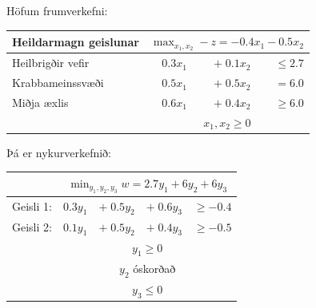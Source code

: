 \begin{daemi}Höfum frumverkefni:
\begin{center}{\renewcommand{\arraystretch}{1.5} \renewcommand{\tabcolsep}{0.2cm}
\begin{tabular}{|l|rrr|}\hline
Heildarmagn geislunar & \multicolumn{3}{c|}{$\max_{x_1,x_2} -z = -0.4x_1 - 0.5x_2$} \\ \hline
Heilbrigðir vefir & $0.3x_1$ & $+\; 0.1x_2$ & $ \le  2.7 $ \\
Krabbameinssvæði & $ 0.5x_1 $&$ +\; 0.5x_2 $&$=  6.0 $ \\
Miðja æxlis & $0.6x_1$&$ +\; 0.4x_2$& $\ge 6.0$ \\ 
& \multicolumn{3}{c|}{$x_1,x_2 \ge 0$} \\ \hline
\end{tabular}} 
\end{center}
\end{daemi}
\begin{lausn}Þá er nykurverkefnið:
\begin{center}{\renewcommand{\arraystretch}{1.5} \renewcommand{\tabcolsep}{0.2cm}
\begin{tabular}{|l|rrrr|}\hline
&\multicolumn{4}{c|}{$\min_{y_1,y_2,y_3} w = 2.7y_1 + 6y_2+6y_3$} \\ \hline
Geisli 1: & $0.3y_1$ & $+\; 0.5y_2$& $+\; 0.6y_3$ & $ \ge -0.4 $ \\
Geisli 2: & $0.1y_1 $&$ +\; 0.5y_2$& $+\; 0.4y_3$& $ \ge -0.5 $ \\
& \multicolumn{4}{c|}{$y_1 \ge 0$} \\ 
& \multicolumn{4}{c|}{$y_2$ óskorðað}  \\ 
& \multicolumn{4}{c|}{$y_3 \le 0$} \\ \hline
\end{tabular}} 
\end{center} 
\end{lausn}
